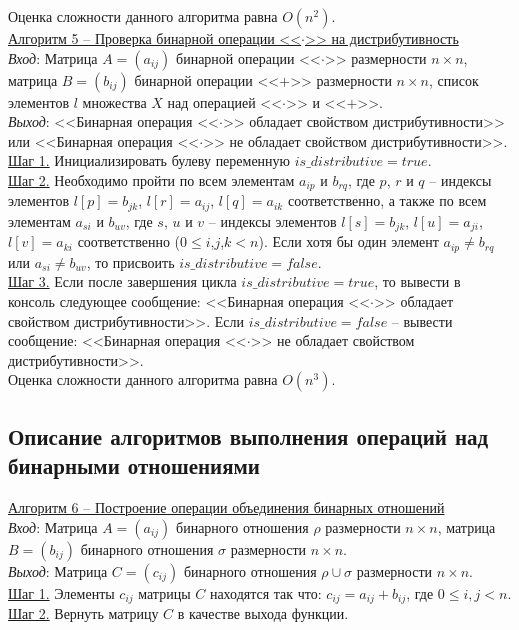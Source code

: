 \documentclass[bachelor, och, labwork]{shiza}
\begin{document}
            Оценка сложности данного алгоритма равна $O(n^2)$.\\
            
        \underline{Алгоритм 5 -- Проверка бинарной операции <<$\cdot$>> на дистрибутивность}\\
            \textit{Вход}: Матрица $A = (a_{ij})$ бинарной операции <<$\cdot$>> размерности $n \times n$, матрица $B = (b_{ij})$ бинарной 
            операции <<$+$>> размерности $n \times n$, список элементов $l$ множества $X$ над операцией <<$\cdot$>> и <<$+$>>.\\
            \textit{Выход}: <<Бинарная операция <<$\cdot$>> обладает свойством дистрибутивности>> или 
            <<Бинарная операция <<$\cdot$>> не обладает свойством дистрибутивности>>.\\
            \underline{Шаг 1.} Инициализировать булеву переменную $is\_distributive = true$.\\
            \underline{Шаг 2.} Необходимо пройти по всем элементам $a_{ip}$ и $b_{rq}$, где $p$, $r$ и $q$ -- 
            индексы элементов $l[p] = b_{jk}$, $l[r] = a_{ij}$, $l[q] = a_{ik}$ соответственно, а также по всем элементам $a_{si}$ и $b_{uv}$, 
            где $s$, $u$ и $v$ -- индексы элементов $l[s] = b_{jk}$, $l[u] = a_{ji}$, $l[v] = a_{ki}$ 
            соответственно ($0 \leq i$,$j$,$k < n$). Если хотя бы один элемент $a_{ip} \neq b_{rq}$ или 
            $a_{si} \neq b_{uv}$, то присвоить $is\_distributive = false$.\\
            \underline{Шаг 3.} Если после завершения цикла $is\_distributive = true$, то вывести в консоль следующее сообщение:
            <<Бинарная операция <<$\cdot$>> обладает свойством дистрибутивности>>. Если $is\_distributive = false$ -- вывести сообщение:
            <<Бинарная операция <<$\cdot$>> не обладает свойством дистрибутивности>>.\\
            
            Оценка сложности данного алгоритма равна $O(n^3)$.\\
        
    \subsection{Описание алгоритмов выполнения операций над бинарными отношениями}
        \underline{Алгоритм 6 -- Построение операции объединения бинарных отношений}\\
            \textit{Вход}: Матрица $A = (a_{ij})$ бинарного отношения $\rho$ размерности $n \times n$, матрица $B = (b_{ij})$ 
            бинарного отношения $\sigma$ размерности $n \times n$.\\
            \textit{Выход}: Матрица $C = (c_{ij})$ бинарного отношения $\rho \cup \sigma$ размерности $n \times n$.\\
            \underline{Шаг 1.} Элементы $c_{ij}$ матрицы $C$ находятся так что: $c_{ij} = a_{ij} + b_{ij}$, где
            $0 \leq i, j < n$. \\
            \underline{Шаг 2.} Вернуть матрицу $C$ в качестве выхода функции.\\
            
\end{document}
